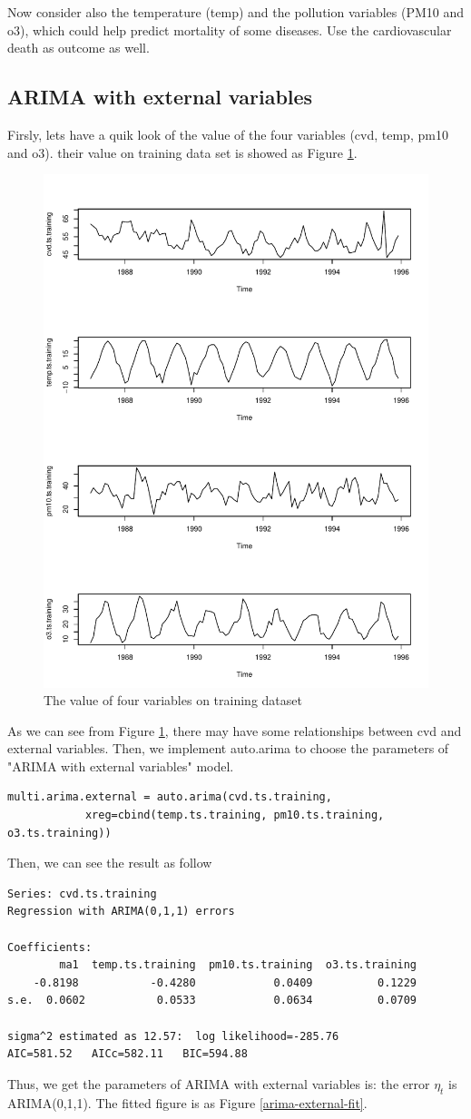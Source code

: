 \documentclass{article}
\begin{document}
Now consider also the temperature (temp) and the pollution variables (PM10 and o3), which could help predict mortality of some diseases. Use the cardiovascular death as outcome as well.

\vspace{4pt}
\subsection{ARIMA with external variables}

Firsly, lets have a quik look of the value of the four variables (cvd, temp, pm10 and o3). their value on training data set is showed as Figure \ref{data-all}.

\vspace{-10pt}
\begin{figure}[H]
    \centering
    \includegraphics[width=0.55\linewidth]{images/multi}
    \caption{The value of four variables on training dataset}
    \label{data-all}
\end{figure}
As we can see from Figure \ref{data-all}, there may have some relationships between cvd and external variables. Then, we implement auto.arima to choose the parameters of 
"ARIMA with external variables" model.
\begin{lstlisting}
multi.arima.external = auto.arima(cvd.ts.training, 
            xreg=cbind(temp.ts.training, pm10.ts.training, o3.ts.training))
\end{lstlisting}
Then, we can see the result as follow
\begin{lstlisting}
Series: cvd.ts.training 
Regression with ARIMA(0,1,1) errors 

Coefficients:
        ma1  temp.ts.training  pm10.ts.training  o3.ts.training
    -0.8198           -0.4280            0.0409          0.1229
s.e.  0.0602           0.0533            0.0634          0.0709

sigma^2 estimated as 12.57:  log likelihood=-285.76
AIC=581.52   AICc=582.11   BIC=594.88
\end{lstlisting}
Thus, we get the parameters of ARIMA with external variables is:
the error $\eta_t$ is ARIMA(0,1,1). The fitted figure is as Figure \ref{arima-external-fit}.
\end{document}
